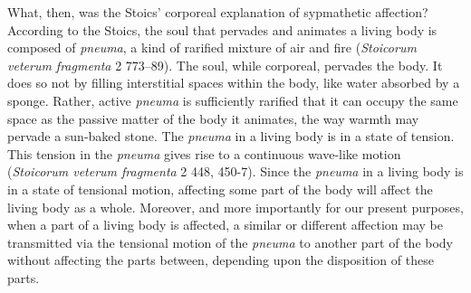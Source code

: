 What, then, was the Stoics' corporeal explanation of sypmathetic affection? According to the Stoics, the soul that pervades and animates a living body is composed of \emph{pneuma}, a kind of rarified mixture of air and fire (\emph{Stoicorum veterum fragmenta} 2 773--89). The soul, while corporeal, pervades the body. It does so not by filling interstitial spaces within the body, like water absorbed by a sponge. Rather, active \emph{pneuma} is sufficiently rarified that it  can occupy the same space as the passive matter of the body it animates, the way warmth may pervade a sun-baked stone. The \emph{pneuma} in a living body is in a state of tension. This tension in the \emph{pneuma} gives rise to a continuous wave-like motion (\emph{Stoicorum veterum fragmenta} 2 448, 450-7). Since the \emph{pneuma} in a living body is in a state of tensional motion, affecting some part of the body will affect the living body as a whole. 
Moreover, and more importantly for our present purposes, when a part of a living body is affected, a similar or different affection may be transmitted via the tensional motion of the \emph{pneuma} to another part of the body without affecting the parts between, depending upon the disposition of these parts.

